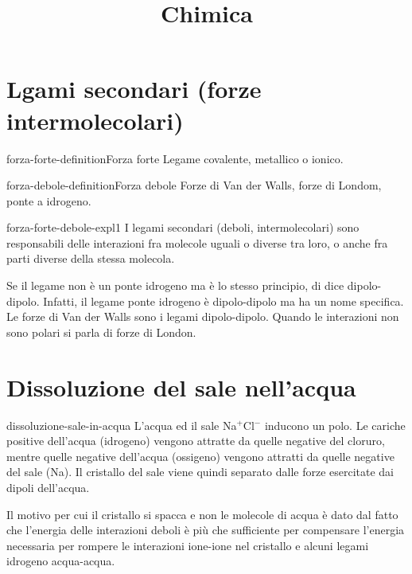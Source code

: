 \documentclass[preview]{standalone}
\begin{document}
\title{Chimica}
\genpage

\section{Lgami secondari (forze intermolecolari)}

\begin{snippetdefinition}{forza-forte-definition}{Forza forte}
    Legame covalente, metallico o ionico.
\end{snippetdefinition}

\begin{snippetdefinition}{forza-debole-definition}{Forza debole}
    Forze di Van der Walls, forze di Londom, ponte a idrogeno.
\end{snippetdefinition}

\begin{snippet}{forza-forte-debole-expl1}
    I legami secondari (deboli, intermolecolari) sono responsabili delle interazioni fra molecole uguali o diverse tra loro,
    o anche fra parti diverse della stessa molecola.

    Se il legame non è un ponte idrogeno ma è lo stesso principio, di dice dipolo-dipolo.
    Infatti, il legame ponte idrogeno è dipolo-dipolo ma ha un nome specifica.
    Le forze di Van der Walls sono i legami dipolo-dipolo.
    Quando le interazioni non sono polari si parla di forze di London.
\end{snippet}

\section{Dissoluzione del sale nell'acqua}

\begin{snippet}{dissoluzione-sale-in-acqua}
L'acqua ed il sale Na\(^{+}\)Cl\(^{-}\) inducono un polo.
Le cariche positive dell'acqua (idrogeno) vengono attratte da quelle negative
del cloruro, mentre quelle negative dell'acqua (ossigeno)
vengono attratti da quelle negative del sale (Na).
Il cristallo del sale viene quindi separato dalle forze
esercitate dai dipoli dell'acqua.

Il motivo per cui il cristallo si spacca e non le molecole di acqua
è dato dal fatto che l'energia delle interazioni deboli è più che sufficiente
per compensare l'energia necessaria per rompere le interazioni ione-ione
nel cristallo e alcuni legami idrogeno acqua-acqua.
\end{snippet}
\end{document}
